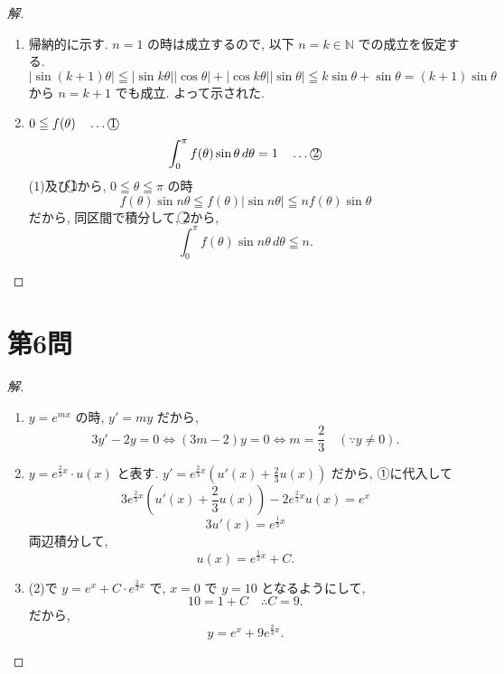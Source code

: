 \documentclass[../main.tex]{subfiles}
\begin{document}
\begin{proof}[解]
  \begin{enumerate}
    \item[(1)] 帰納的に示す. $n=1$ の時は成立するので, 以下 $n=k \in \mathbb{N}$ での成立を仮定する.
      \[
        |\sin(k+1)\theta| \leqq |\sin k\theta||\cos\theta| + |\cos k\theta||\sin\theta| \leqq k\sin\theta + \sin\theta = (k+1)\sin\theta
      \]
      から $n=k+1$ でも成立. よって示された.

    \item[(2)] $0 \leqq f(\theta) \quad \dots \text{\textcircled{1}}$
      \[
        \int_0^\pi f(\theta) \sin\theta \, d\theta = 1 \quad \dots \text{\textcircled{2}}
      \]
      (1)及び\textcircled{1}から, $0 \leqq \theta \leqq \pi$ の時
      \[
        f(\theta) \sin n\theta \leqq f(\theta) |\sin n\theta| \leqq n f(\theta) \sin\theta
      \]
      だから, 同区間で積分して, \textcircled{2}から,
      \[
        \int_0^\pi f(\theta) \sin n\theta \, d\theta \leqq n.
      \]
  \end{enumerate}
\end{proof}

\section*{第6問}

\begin{proof}[解]
  \begin{enumerate}
    \item[(1)] $y = e^{mx}$ の時, $y' = my$ だから,
      \[
        3y' - 2y = 0 \iff (3m-2)y = 0 \iff m = \frac{2}{3} \quad (\because y \neq 0).
      \]

    \item[(2)] $y = e^{\frac{2}{3}x} \cdot u(x)$ と表す. $y' = e^{\frac{2}{3}x} \left(u'(x) + \frac{2}{3}u(x)\right)$ だから, ①に代入して
      \[
        3 e^{\frac{2}{3}x} \left(u'(x) + \frac{2}{3}u(x)\right) - 2 e^{\frac{2}{3}x} u(x) = e^x
      \]
      \[
        3 u'(x) = e^{\frac{1}{3}x}
      \]
      両辺積分して,
      \[
        u(x) = e^{\frac{1}{3}x} + C.
      \]

    \item[(3)] (2)で $y = e^x + C \cdot e^{\frac{2}{3}x}$ で, $x=0$ で $y=10$ となるようにして,
      \[
        10 = 1 + C \quad \therefore C = 9.
      \]
      だから,
      \[
        y = e^x + 9 e^{\frac{2}{3}x}.
      \]
  \end{enumerate}
\end{proof}
\end{document}
